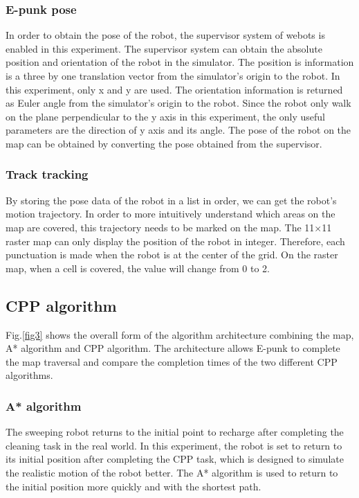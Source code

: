 \documentclass[conference]{IEEEtran}
\begin{document}
\subsubsection{E-punk pose}

In order to obtain the pose of the robot, the supervisor system of webots is enabled in this experiment. The supervisor system can obtain the absolute position and orientation of the robot in the simulator. The position is information is a three by one translation vector from the simulator's origin to the robot. In this experiment, only x and y are used. The orientation information is returned as Euler angle from the simulator's origin to the robot. Since the robot only walk on the plane perpendicular to the y axis in this experiment, the only useful parameters are the direction of y axis and its angle. The pose of the robot on the map can be obtained by converting the pose obtained from the supervisor. 

\subsubsection{Track tracking}

By storing the pose data of the robot in a list in order, we can get the robot's motion trajectory. In order to more intuitively understand which areas on the map are covered, this trajectory needs to be marked on the map. The 11×11 raster map can only display the position of the robot in integer. Therefore, each punctuation is made when the robot is at the center of the grid. On the raster map, when a cell is covered, the value will change from 0 to 2.

\subsection{CPP algorithm}

Fig.\ref{fig3} shows the overall form of the algorithm architecture combining the map, A* algorithm and CPP algorithm. The architecture allows E-punk to complete the map traversal and compare the completion times of the two different CPP algorithms. 
 
\subsubsection{A* algorithm}
The sweeping robot returns to the initial point to recharge after completing the cleaning task in the real world. In this experiment, the robot is set to return to its initial position after completing the CPP task, which is designed to simulate the realistic motion of the robot better. The A* algorithm\cite{hart1968formal} is used to return to the initial position more quickly and with the shortest path.\\
\end{document}
